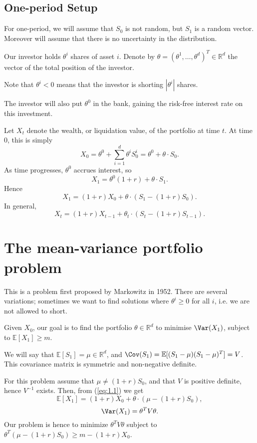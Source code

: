 \documentclass[12pt]{article}
\begin{document}
\subsection{One-period Setup}
\label{sub:one_period_setup}

For one-period, we will assume that $S_0$ is not random, but $S_1$ is a random vector. Moreover will assume that there is no uncertainty in the distribution.

Our investor holds $\theta^i$ shares of asset $i$. Denote by $\theta = (\theta^1, \ldots, \theta^d)^T \in \mathbb{R}^d$ the vector of the total position of the investor.

Note that $\theta^i < 0$ means that the investor is shorting $|\theta^i|$ shares.

The investor will also put $\theta^0$ in the bank, gaining the risk-free interest rate on this investment.

Let $X_t$ denote the wealth, or liquidation value, of the portfolio at time $t$. At time $0$, this is simply
\[
X_0 = \theta^0 + \sum_{i=1}^{d} \theta^i S^i_0 = \theta^0 + \theta \cdot S_0.
\]
As time progresses, $\theta^0$ accrues interest, so
\[
X_1 = \theta^0 (1+r) + \theta \cdot S_1.
\]
Hence
\[
	X_1 = (1+r)X_0 + \theta \cdot (S_1 - (1+r) S_0). \tag{1.1}\label{eq:1.1}
\]
In general,
\[
	X_t = (1+r)X_{t-1} + \theta_t \cdot (S_t - (1+r)S_{t-1}). \tag{1.2}\label{eq:1.2}
\]

\newpage

\section{The mean-variance portfolio problem}
\label{sec:mv_problem}

This is a problem first proposed by Markowitz in 1952. There are several variations; sometimes we want to find solutions where $\theta^i \geq 0$ for all $i$, i.e. we are not allowed to short.

Given $X_0$, our goal is to find the portfolio $\theta \in \mathbb{R}^{d}$ to minimise $\Var(X_1)$, subject to $\mathbb{E}[X_1] \ge m$.

We will say that $\mathbb{E}[S_1] = \mu \in \mathbb{R}^{d}$, and $\Cov(S_1) = \mathbb{E}[(S_1 - \mu)(S_1 - \mu)^T] = V$. This covariance matrix is symmetric and non-negative definite.

For this problem assume that $\mu \neq (1+r)S_0$, and that $V$ is positive definite, hence $V^{-1}$ exists. Then, from (\ref{eq:1.1}) we get
\[
\mathbb{E}[X_1] = (1+r)X_0 + \theta \cdot (\mu - (1+r)S_0),
\]
\[
\Var(X_1) = \theta^{T} V \theta.
\]
Our problem is hence to minimize $\theta^T V \theta$ subject to $\theta^T (\mu - (1+r)S_0) \ge m - (1+r)X_0$.
\end{document}
